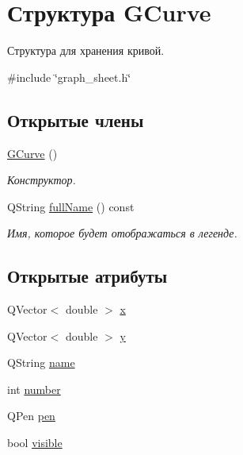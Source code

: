 \hypertarget{struct_g_curve}{}\section{Структура G\+Curve}
\label{struct_g_curve}


Структура для хранения кривой.  




{\ttfamily \#include \char`\"{}graph\+\_\+sheet.\+h\char`\"{}}

\subsection*{Открытые члены}
\begin{DoxyCompactItemize}
\item 
\hyperlink{struct_g_curve_aac51f0bf1cb305e7872d94ee88eef9ba}{G\+Curve} ()\hypertarget{struct_g_curve_aac51f0bf1cb305e7872d94ee88eef9ba}{}\label{struct_g_curve_aac51f0bf1cb305e7872d94ee88eef9ba}

\begin{DoxyCompactList}\small\item\em Конструктор. \end{DoxyCompactList}\item 
Q\+String \hyperlink{struct_g_curve_aa80c9c2251eee536ac53b177115513d7}{full\+Name} () const 
\begin{DoxyCompactList}\small\item\em Имя, которое будет отображаться в легенде. \end{DoxyCompactList}\end{DoxyCompactItemize}
\subsection*{Открытые атрибуты}
\begin{DoxyCompactItemize}
\item 
Q\+Vector$<$ double $>$ \hyperlink{struct_g_curve_af4a77d5615109cd4068e11dcc2b52615}{x}
\item 
Q\+Vector$<$ double $>$ \hyperlink{struct_g_curve_a40d381ce3d5ea2ccf654b9e35a8f594b}{y}
\item 
Q\+String \hyperlink{struct_g_curve_a39cc624ec8dffac8afb249e9c6861b88}{name}
\item 
int \hyperlink{struct_g_curve_a67acaf70967bdbaa8c02c614502baacc}{number}
\item 
Q\+Pen \hyperlink{struct_g_curve_ac3f500b2153788be5232dc7a623354ce}{pen}
\item 
bool \hyperlink{struct_g_curve_ac00a68184b569dda559808f50729f96a}{visible}
\end{DoxyCompactItemize}


